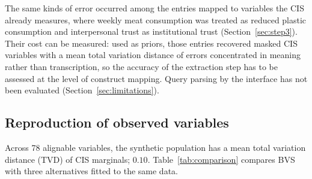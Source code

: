 The same kinds of error occurred among the entries mapped to variables the CIS
already measures, where weekly meat consumption was treated as reduced plastic
consumption and interpersonal trust as institutional trust
(Section~\ref{sec:step3}). Their cost can be measured: used as priors,
those entries recovered masked CIS variables with a mean total variation
distance of %
errors concentrated in meaning rather than transcription, so the accuracy of
the extraction step has to be assessed at the level of construct mapping. Query parsing
by the interface has not been evaluated (Section~\ref{sec:limitations}).

\subsection{Reproduction of observed variables}
\label{sec:res_fidelity}

Across 78 alignable variables, the synthetic population has a mean total
variation distance (TVD) of %
CIS marginals; %
$0.10$. Table~\ref{tab:comparison} compares BVS with three alternatives fitted
to the same data.


